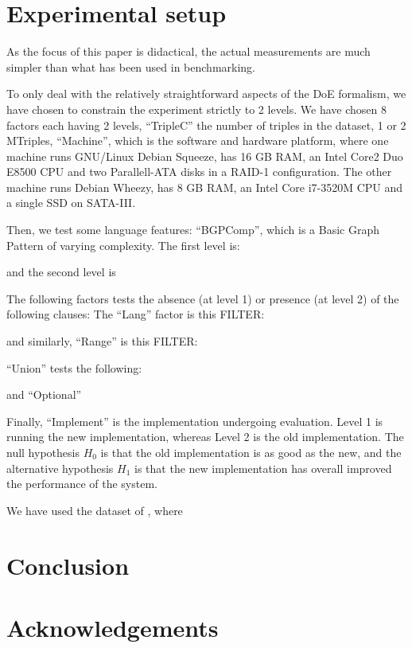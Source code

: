 \documentclass{article}
\begin{document}
\section{Experimental setup}

As the focus of this paper is didactical, the actual measurements are
much simpler than what has been used in benchmarking. 

To only deal with the relatively straightforward aspects of the DoE
formalism, we have chosen to constrain the experiment strictly to 2
levels. We have chosen 8 factors each having 2 levels, ``TripleC'' the number of triples in the
dataset, 1 or 2 MTriples, ``Machine'', which is the software and hardware platform,
where one machine runs GNU/Linux Debian Squeeze, has 16 GB RAM, an
Intel Core2 Duo E8500 CPU and two Parallell-ATA disks in a RAID-1
configuration. The other machine runs Debian Wheezy, has 8 GB RAM, an
Intel Core i7-3520M CPU and a single SSD on SATA-III. 

Then, we test some language features: 
``BGPComp'', which is a Basic Graph Pattern of varying complexity. The
first level is:

and the second level is 


The following factors tests the absence (at level 1) or presence (at level 2) of the following clauses:
The ``Lang'' factor is this FILTER:

and similarly,  ``Range'' is this FILTER:

``Union'' tests the following:

and ``Optional''


Finally, ``Implement'' is the implementation undergoing
evaluation. Level 1 is running the new implementation, whereas Level 2
is the old implementation. The null hypothesis $H_0$ is that the old
implementation is as good as the new, and the alternative hypothesis
$H_1$ is that the new implementation has overall improved the
performance of the system.

We have used the dataset of \cite{mxro:Morsey2011DBpedia}, where 

\section{Conclusion}

\section*{Acknowledgements}




%
%
%

\end{document}
